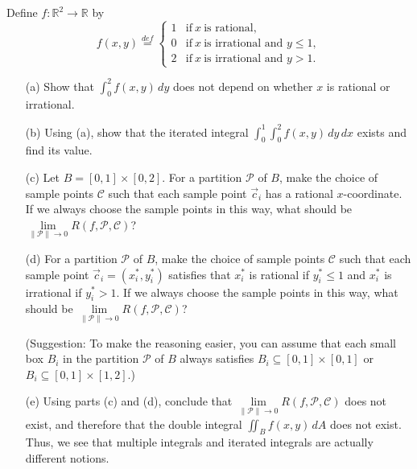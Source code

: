 \documentclass[11pt,letterpaper,cm]{nupset}
\begin{document}
\begin{problem}[Exercise 5]
	Define $f:\mathbb{R}^2\to\mathbb{R}$ by $$f(x,y)\stackrel{def}{=}\begin{cases} 1 & \mbox{if}\ x\ \mbox{is rational},\\ 0 & \mbox{if}\ x\ \mbox{is irrational and } y\leq 1,\\ 2 & \mbox{if}\ x\ \mbox{is irrational and } y> 1.\end{cases}$$
	\begin{itemize}
		\item[(a)] Show that $\displaystyle\int_0^2 f(x,y)\,dy$ does not depend on whether $x$ is rational or irrational.
		\item[(b)] Using (a), show that the iterated integral $\displaystyle\int_0^1 \int_0^2 f(x,y)\,dy\,dx$ exists and find its value.
		\item[(c)] Let $B=[0,1]\times[0,2]$. For a partition $\mathcal{P}$ of $B$, make the choice of sample points $\mathcal{C}$ such that each sample point $\vec{c}_i$ has a rational $x$-coordinate.  If we always choose the sample points in this way, what should be $\lim\limits_{\|\mathcal{P}\|\to 0} R(f,\mathcal{P},\mathcal{C})$?
		\item[(d)] For a partition $\mathcal{P}$ of $B$, make the choice of sample points $\mathcal{C}$ such that each sample point $\vec{c}_i=(x_i^\ast,y_i^\ast)$ satisfies that $x_i^\ast$ is rational if $y_i^\ast\leq 1$ and $x_i^\ast$ is irrational if $y_i^\ast>1$.  If we always choose the sample points in this way, what should be $\lim\limits_{\|\mathcal{P}\|\to 0} R(f,\mathcal{P},\mathcal{C})$? 
		
		(Suggestion: To make the reasoning easier, you can assume that each small box $B_i$ in the partition $\mathcal{P}$ of $B$ always satisfies $B_i\subseteq [0,1]\times[0,1]$ or $B_i\subseteq[0,1]\times[1,2]$.)
		\item[(e)] Using parts (c) and (d), conclude that $\lim\limits_{\|\mathcal{P}\|\to 0} R(f,\mathcal{P},\mathcal{C})$ does not exist, and therefore that the double integral $\iint_B f(x,y)\,dA$ does not exist. Thus, we see that multiple integrals and iterated integrals are actually different notions.
	\end{itemize}
\end{problem}
\end{document}
